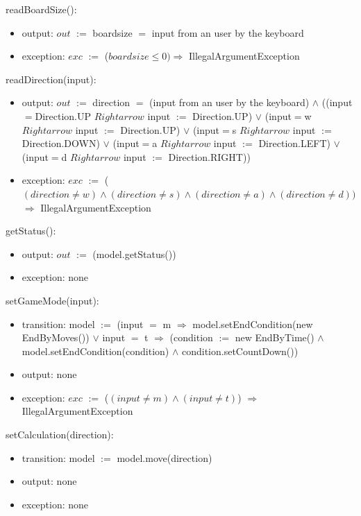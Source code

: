 \documentclass[12pt]{article}
\begin{document}
\noindent readBoardSize():
\begin{itemize}
  \item output: $out$ $:=$ boardsize $=$ input from an user by the keyboard
  \item exception: $exc$ $:=$ ($boardsize \leq 0) \Rightarrow$ IllegalArgumentException
\end{itemize}

\noindent readDirection(input):
\begin{itemize}
  \item output: $out$ $:=$ direction $=$ (input from an user by the keyboard) $\wedge$ ((input$=$Direction.UP $Rightarrow$ input $:=$ Direction.UP) $\vee$ (input$=$w $Rightarrow$ input $:=$ Direction.UP) $\vee$ (input$=$s $Rightarrow$ input $:=$ Direction.DOWN) $\vee$ (input$=$a $Rightarrow$ input $:=$ Direction.LEFT) $\vee$ (input$=$d $Rightarrow$ input $:=$ Direction.RIGHT))
  \item exception: $exc$ $:=$ ($(direction \neq w) \wedge (direction \neq s) \wedge (direction \neq a) \wedge (direction \neq d))$ $\Rightarrow$ IllegalArgumentException
\end{itemize}

\noindent getStatus():
\begin{itemize}
  \item output: $out$ $:=$ (model.getStatus())
  \item exception: none
\end{itemize}

\noindent setGameMode(input):
\begin{itemize}
  \item transition: model $:=$ (input $=$ m $\Rightarrow$ model.setEndCondition(new EndByMoves()) $\vee$ input $=$ t $\Rightarrow$ (condition $:=$ new EndByTime() $\wedge$ model.setEndCondition(condition) $\wedge$ condition.setCountDown())
  \item output: none
  \item exception: $exc$ $:=$ ($(input \neq m) \wedge (input \neq t)$) $\Rightarrow$ IllegalArgumentException
\end{itemize}

\noindent setCalculation(direction):
\begin{itemize}
  \item transition: model $:=$ model.move(direction)
  \item output: none
  \item exception: none
\end{itemize}
\end{document}

